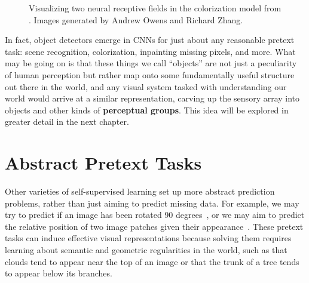 \begin{figure}[h!]
{\begin{minipage}{.5\linewidth}
\end{minipage}
}
\caption{Visualizing two neural receptive fields in the colorization model from \cite{zhang2016colorful}. Images generated by Andrew Owens and Richard Zhang.}
\label{fig:representation_learning:obj_detectors_in_colorization}
\end{figure}

In fact, object detectors emerge in CNNs for just about any reasonable pretext task: scene recognition, colorization, inpainting missing pixels, and more. What may be going on is that these things we call ``objects'' are not just a peculiarity of human perception but rather map onto some fundamentally useful structure out there in the world, and any visual system tasked with understanding our world would arrive at a similar representation, carving up the sensory array into objects and other kinds of \textbf{perceptual groups}. This idea will be explored in greater detail in the next chapter. %

\section{Abstract Pretext Tasks}
Other varieties of self-supervised learning set up more abstract prediction problems, rather than just aiming to predict missing data. For example, we may try to predict if an image has been rotated 90 degrees~\cite{komodakis2018unsupervised}, or we may aim to predict the relative position of two image patches given their appearance~\cite{doersch2015unsupervised}. These pretext tasks can induce effective visual representations because solving them requires learning about semantic and geometric regularities in the world, such as that clouds tend to appear near the top of an image or that the trunk of a tree tends to appear below its branches.

